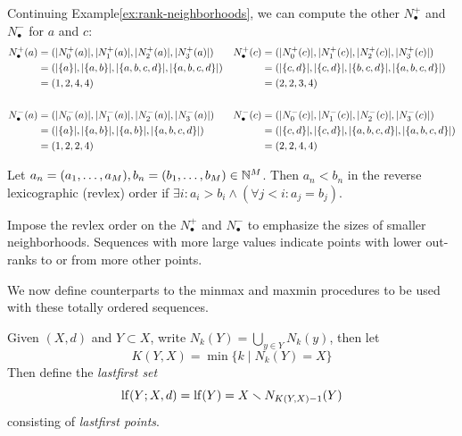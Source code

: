 \documentclass[
]{article}
\begin{document}
\begin{example}\label{ex:rank-sequence}
Continuing Example\nbs\ref{ex:rank-neighborhoods}, we can compute the other $N_\bullet^+$ and $N_\bullet^-$ for $a$ and $c$:
\begin{align*}
    N_\bullet^+ (a) &= (\lvert N^+_0(a)\rvert, \lvert N^+_1(a)\rvert, \lvert N^+_2(a)\rvert, \lvert N^+_3(a)\rvert) &
    N_\bullet^+ (c) &= (\lvert N^+_0(c)\rvert, \lvert N^+_1(c)\rvert, \lvert N^+_2(c)\rvert, \lvert N^+_3(c)\rvert) \\
    &= (\lvert \{a\}\rvert, \lvert \{a, b\}\rvert, \lvert \{a, b, c, d\}\rvert, \lvert \{a, b, c, d\}\rvert) &
    &= (\lvert \{c, d\}\rvert, \lvert \{c, d\}\rvert, \lvert \{b, c, d\}\rvert, \lvert \{a, b, c, d\}\rvert) \\
    &= (1, 2, 4, 4) &
    &= (2, 2, 3, 4) \\
    \\
    N_\bullet^- (a) &= (\lvert N^-_0(a)\rvert, \lvert N^-_1(a)\rvert, \lvert N^-_2(a)\rvert, \lvert N^-_3(a)\rvert) &
    N_\bullet^- (c) &= (\lvert N^-_0(c)\rvert, \lvert N^-_1(c)\rvert, \lvert N^-_2(c)\rvert, \lvert N^-_3(c)\rvert) \\
    &= (\lvert \{a\}\rvert, \lvert \{a, b\}\rvert, \lvert \{a, b\}\rvert, \lvert \{a, b, c, d\}\rvert) &
    &= (\lvert \{c, d\}\rvert, \lvert \{c, d\}\rvert, \lvert \{a, b, c, d\}\rvert, \lvert \{a, b, c, d\}\rvert) \\
    &= (1, 2, 2, 4) &
    &= (2, 2, 4, 4)
\end{align*}
\end{example}

\begin{definition}
    Let $a_n = (a_1,\ldots,a_M),b_n = (b_1,\ldots,b_M)\in\mathbb{N}^M$.
    Then $a_n < b_n$ in the reverse lexicographic (revlex) order if $\exists i : a_i > b_i \wedge (\forall j<i : a_j = b_j)$.
\end{definition}

Impose the revlex order on the \(N_\bullet^+\) and \(N_\bullet^-\) to
emphasize the sizes of smaller neighborhoods. Sequences with more large
values indicate points with lower out-ranks to or from more other
points.

We now define counterparts to the minmax and maxmin procedures to be
used with these totally ordered sequences.

\begin{definition}
    Given $(X,d)$ and $Y \subset X$, write $N_k(Y) = \bigcup_{y \in Y}{N_k(y)}$, then let
    $$K(Y,X) = \min\{ k \mid N_k(Y) = X \}$$
    Then define the \emph{lastfirst set}
    $$\operatorname{lf}(Y;X,d) = \operatorname{lf}(Y) = X \smallsetminus N_{K(Y,X) - 1}(Y)$$
    consisting of \emph{lastfirst points}.
\end{definition}
\end{document}

